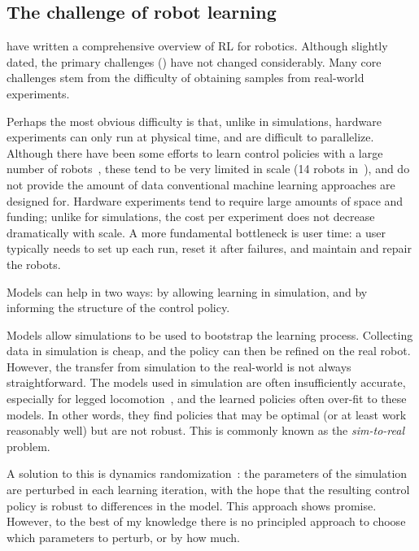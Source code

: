 \subsection{The challenge of robot learning}

\textcite{kober2013reinforcement} have written a comprehensive overview of RL for robotics. Although slightly dated, the primary challenges (\cite[see 8.1 in]{kober2013reinforcement}) have not changed considerably. Many core challenges stem from the difficulty of obtaining samples from real-world experiments. \par
Perhaps the most obvious difficulty is that, unlike in simulations, hardware experiments can only run at physical time, and are difficult to parallelize. Although there have been some efforts to learn control policies with a large number of robots~\cite{levine2018learning}, these tend to be very limited in scale (14 robots in~\cite{levine2018learning}), and do not provide the amount of data conventional machine learning approaches are designed for.
Hardware experiments tend to require large amounts of space and funding; unlike for simulations, the cost per experiment does not decrease dramatically with scale.
A more fundamental bottleneck is user time: a user typically needs to set up each run, reset it after failures, and maintain and repair the robots. \par
Models can help in two ways: by allowing learning in simulation, and by informing the structure of the control policy.
 \par
Models allow simulations to be used to bootstrap the learning process. Collecting data in simulation is cheap, and the policy can then be refined on the real robot. However, the transfer from simulation to the real-world is not always straightforward.
The models used in simulation are often insufficiently accurate, especially for legged locomotion~\cite{neunert2017off,tan2018sim}, and the learned policies often over-fit to these models. In other words, they find policies that may be optimal (or at least work reasonably well) but are not robust. This is commonly known as the \emph{sim-to-real} problem. \par
A solution to this is dynamics randomization~\cite{peng2017sim,lowrey2018reinforcement,tan2018sim}: the parameters of the simulation are perturbed in each learning iteration, with the hope that the resulting control policy is robust to differences in the model. This approach shows promise. However, to the best of my knowledge there is no principled approach to choose which parameters to perturb, or by how much. \par
